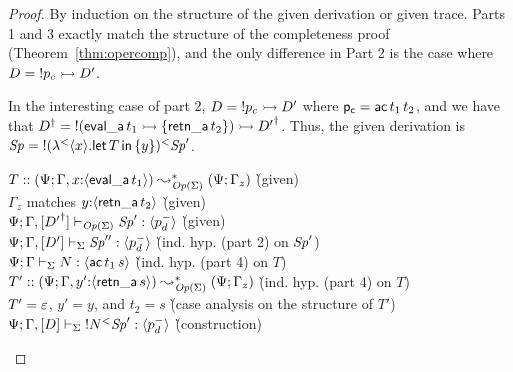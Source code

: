 \begin{proof}
By induction on the structure of the given derivation or given trace. Parts 
1 and 3 exactly match the structure of the completeness proof 
(Theorem~\ref{thm:opercomp}), and the only difference in Part 2 is the case
where $D = {!}p_c \rightarrowtail D'$. 

In the interesting case of part 2, $D = {!}p_c \rightarrowtail D'$ where ${\sf
  p_c} = {\sf ac}\,t_1\,t_2$, and we have that 
${{D}^\dag} = {!}({\sf eval\_a}\,t_1
\rightarrowtail \{ {\sf retn\_a}\,t_2 \}) \rightarrowtail {{D'}^\dag}$. Thus, 
the given derivation is 
${\it Sp} = {{!}{({\lambda}^{<}{\langle {x} \rangle . {{\sf let}\,{T}\,{\sf in}\,\{ {y} \}}})}}{^{<}}{{\it Sp}'}$.

\begin{tabbing}
$T :: (\Psi; \Gamma, x{:}\langle {{\sf eval\_a}\,t_1} \rangle) \leadsto^*_{{\it Op}({\Sigma})} (\Psi; \Gamma_z)$
 \` (given)
\\
$\Gamma_z$ matches $y{:}\langle {{\sf retn\_a}\,t_2} \rangle$ 
 \` (given)
\\
${\Psi}; {\Gamma, [{{D'}^\dag}]} \vdash_{{\it Op}({\Sigma})} {{\it Sp}'} : {\langle {p^-_d} \rangle}$
 \` (given)
\\
${\Psi}; {\Gamma, [{D'}]} \vdash_{{\Sigma}} {{\it Sp}''} : {\langle {p^-_d} \rangle}$
 \` (ind. hyp. (part 2) on ${\it Sp}'$)
\\
${\Psi}; {\Gamma} \vdash_{\Sigma} {N} : {\langle {{\sf ac}\,t_1\,s} \rangle}$
 \` (ind. hyp. (part 4) on $T$)
\\
$T' :: (\Psi; \Gamma, y'{:}\langle {{\sf retn\_a}\,s} \rangle)
         \leadsto^*_{{\it Op}({\Sigma})}
       (\Psi; \Gamma_z)$
 \` (ind. hyp. (part 4) on $T$)
\\
$T' = \varepsilon$, $y' = y$, and $t_2 = s$
 \` (case analysis on the structure of $T'$)
\\
${\Psi}; {\Gamma, [D]} \vdash_{\Sigma} {{{!}{N}}{^{<}}{{\it Sp}'}} : {\langle {p^-_d} \rangle}$
 \` (construction)
\end{tabbing}


\end{proof}
